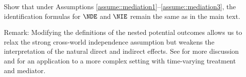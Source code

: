 Show that under Assumptions \ref{assume::mediation1}--\ref{assume::mediation3}, the identification formulas for $\NDE$ and $\NIE$ remain the same as in the main text. 



Remark: Modifying the definitions of the nested potential outcomes allows us to relax the strong cross-world independence assumption but weakens the interpretation of the natural direct and indirect effects. See \citet{vanderweele2015explanation} for more discussion and \citet{vanderweele2017mediation} for an application to a more complex setting with time-varying treatment and mediator.

  
  
 

